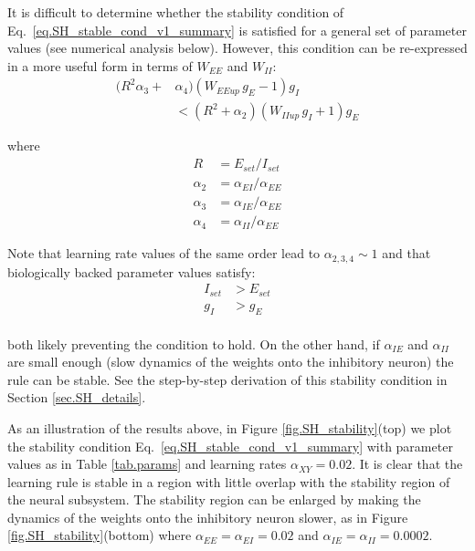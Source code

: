 \documentclass[twocolumn]{article}
\newcommand{\EE}{\mathit{EE}}
\newcommand{\EI}{\mathit{EI}}
\newcommand{\IE}{\mathit{IE}}
\newcommand{\II}{\mathit{II}}
\newcommand{\XY}{\mathit{XY}}
\newcommand{\set}{\mathit{set}}
\newcommand{\up}{\mathit{up}}
\begin{document}
It is difficult to determine whether the stability condition of Eq.\ \ref{eq.SH_stable_cond_v1_summary} is satisfied for a general set of parameter values (see numerical analysis below). However, this condition can be re-expressed in a more useful form in terms of $W_{\EE}$ and $W_{\II}$:
\begin{equation}
\begin{aligned}
(R^2 \alpha_3 + & \alpha_4)(W_{\EE\up} \, g_E  - 1)g_I \\
& < (R^2 + \alpha_2)(W_{\II\up} \, g_I + 1)g_E
\end{aligned}
\label{eq.SH_stable_cond_v2_summary}
\end{equation}

\noindent where
\begin{displaymath}
\begin{aligned}
R & = E_{\set}/I_{\set} \\
\alpha_2 & = \alpha_{\EI}/\alpha_{\EE} \\
\alpha_3 & = \alpha_{\IE}/\alpha_{\EE} \\
\alpha_4 & = \alpha_{\II}/\alpha_{\EE}
\end{aligned}
\end{displaymath}

\noindent Note that learning rate values of the same order lead to $\alpha_{2,3,4} \sim 1$ and that biologically backed parameter values satisfy: 
\begin{displaymath}
\begin{aligned}
I_{\set} & > E_{\set} \\
g_I & > g_E \\
\end{aligned}
\end{displaymath}

\noindent both likely preventing the condition to hold. On the other hand, if $\alpha_{\IE}$ and $\alpha_{\II}$ are small enough (slow dynamics of the weights onto the inhibitory neuron) the rule can be stable. See the step-by-step derivation of this stability condition in Section \ref{sec.SH_details}.

As an illustration of the results above, in Figure \ref{fig.SH_stability}(top) we plot the stability condition Eq.\ \ref{eq.SH_stable_cond_v1_summary} with parameter values as in Table \ref{tab.params} and learning rates $\alpha_{\XY} = 0.02$. It is clear that the learning rule is stable in a region with little overlap with the stability region of the neural subsystem. The stability region can be enlarged by making the dynamics of the weights onto the inhibitory neuron slower, as in Figure \ref{fig.SH_stability}(bottom) where $\alpha_{\EE}=\alpha_{\EI}=0.02$ and $\alpha_{\IE}=\alpha_{\II}=0.0002$.
\end{document}
